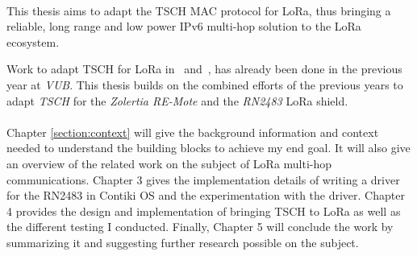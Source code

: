 \paragraph{}

This thesis aims to adapt the TSCH MAC protocol for LoRa,
thus bringing a reliable, long range and low power IPv6 multi-hop
solution to the LoRa ecosystem.

Work to adapt TSCH for LoRa in~\cite{8847137} and~\cite{njomgang_2018}, has
already been done in the previous year at \emph{VUB}.
This thesis builds on the combined efforts of the previous
years to adapt \emph{TSCH} for the \emph{Zolertia RE-Mote} and the
\emph{RN2483} LoRa shield.

\paragraph{}

Chapter \ref{section:context} will give the background information and context needed to
understand the building blocks to achieve my end goal.
It will also give an overview of the related work on the subject of
LoRa multi-hop communications.
Chapter 3 gives the implementation details of writing a driver for the
RN2483 in Contiki OS and the experimentation with the driver.
Chapter 4 provides the design and implementation of bringing TSCH to LoRa as well as
the different testing I conducted.
Finally, Chapter 5 will conclude the work by summarizing it and suggesting
further research possible on the subject.
